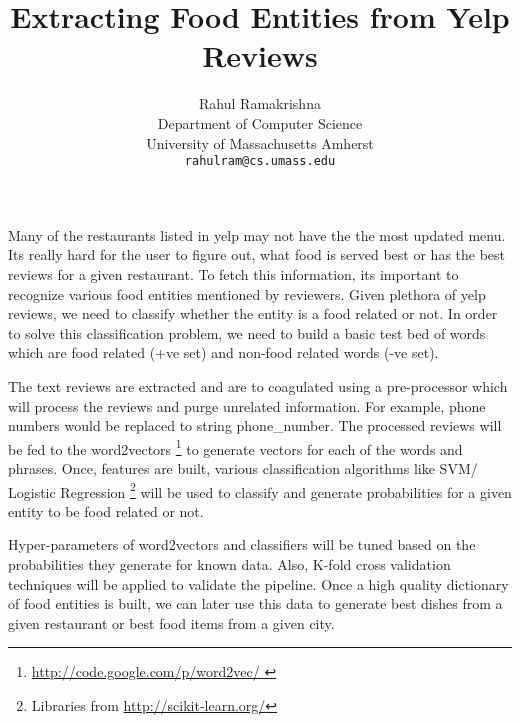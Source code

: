 \documentclass{article} %
\title{Extracting Food Entities from Yelp Reviews}
\author{
Rahul Ramakrishna \\
Department of Computer Science\\
University of Massachusetts Amherst\\
\texttt{rahulram@cs.umass.edu} \\
}
\begin{document}
\maketitle


Many of the restaurants listed in yelp may not have the the most updated menu. Its really hard for the user to figure out, what food is served best or has the best reviews for a given restaurant. To fetch this information, its important to recognize various food entities mentioned by reviewers. Given plethora of yelp reviews, we need to classify whether the entity is a food related or not. In order to solve this classification problem, we need to build a basic test bed of words which are food related (+ve set) and non-food related words (-ve set). 

The text reviews are extracted and are to coagulated using a pre-processor which will process the reviews and purge unrelated information. For example, phone numbers would be replaced to string phone\_number. The processed reviews will be fed to the word2vectors \footnote{ \url{http://code.google.com/p/word2vec/ } } to generate vectors for each of the words and phrases. Once, features are built, various classification algorithms like SVM/ Logistic Regression \footnote{ Libraries from \url{http://scikit-learn.org/}} will be used to classify and generate probabilities for a given entity to be food related or not. 

Hyper-parameters of word2vectors and classifiers will be tuned based on the probabilities they generate for known data. Also, K-fold cross validation techniques will be applied to validate the pipeline.
Once a high quality dictionary of food entities is built, we can later use this data to generate best dishes from a given restaurant or best food items from a given city.
\end{document}
